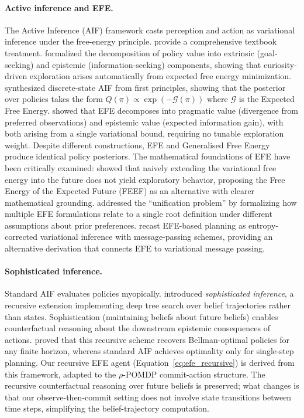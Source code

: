 \documentclass[runningheads]{llncs}
\begin{document}
\paragraph{Active inference and EFE.}
The Active Inference (AIF) framework \citep{friston2010} casts perception and action as variational inference under the free-energy principle. \citet{parr2022} provide a comprehensive textbook treatment. \citet{friston2015} formalized the decomposition of policy value into extrinsic (goal-seeking) and epistemic (information-seeking) components, showing that curiosity-driven exploration arises automatically from expected free energy minimization. \citet{dacosta2020} synthesized discrete-state AIF from first principles, showing that the posterior over policies takes the form $Q(\pi) \propto \exp(-\mathcal{G}(\pi))$ where $\mathcal{G}$ is the Expected Free Energy. \citet{parr2019} showed that EFE decomposes into pragmatic value (divergence from preferred observations) and epistemic value (expected information gain), with both arising from a single variational bound, requiring no tunable exploration weight. Despite different constructions, EFE and Generalised Free Energy produce identical policy posteriors. The mathematical foundations of EFE have been critically examined: \citet{millidge2021} showed that naively extending the variational free energy into the future does not yield exploratory behavior, proposing the Free Energy of the Expected Future (FEEF) as an alternative with clearer mathematical grounding. \citet{champion2024} addressed the ``unification problem'' by formalizing how multiple EFE formulations relate to a single root definition under different assumptions about prior preferences. \citet{devries2025} recast EFE-based planning as entropy-corrected variational inference with message-passing schemes, providing an alternative derivation that connects EFE to variational message passing.

\paragraph{Sophisticated inference.}
Standard AIF evaluates policies myopically. \citet{friston2021} introduced \emph{sophisticated inference}, a recursive extension implementing deep tree search over belief trajectories rather than states. Sophistication (maintaining beliefs about future beliefs) enables counterfactual reasoning about the downstream epistemic consequences of actions. \citet{dacosta2020b} proved that this recursive scheme recovers Bellman-optimal policies for any finite horizon, whereas standard AIF achieves optimality only for single-step planning. Our recursive EFE agent (Equation~\ref{eq:efe_recursive}) is derived from this framework, adapted to the $\rho$-POMDP commit-action structure. The recursive counterfactual reasoning over future beliefs is preserved; what changes is that our observe-then-commit setting does not involve state transitions between time steps, simplifying the belief-trajectory computation.
\end{document}

